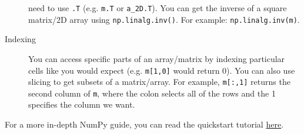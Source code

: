 \begin{description}
    need to use \texttt{.T} (e.g. \texttt{m.T} or \texttt{a\_2D.T}). You can get the inverse of a
    square matrix/2D array using \texttt{np.linalg.inv()}. For example: \texttt{np.linalg.inv(m)}.
  \item[Indexing] You can access specific parts of an array/matrix by indexing particular cells like
    you would expect (e.g. \texttt{m[1,0]} would return 0). You can also use slicing to get subsets
    of a matrix/array. For example, \texttt{m[:,1]} returns the second column of \texttt{m}, where
    the colon selects all of the rows and the 1 specifies the column we want.
\end{description}

For a more in-depth NumPy guide, you can read the quickstart tutorial
\href{https://docs.scipy.org/doc/numpy-dev/user/quickstart.html}{here}.
